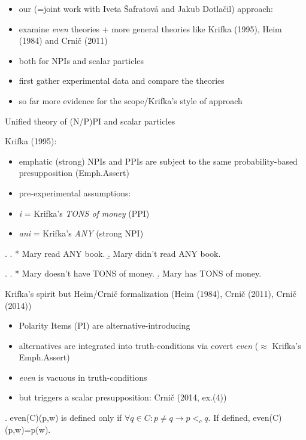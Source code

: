 \documentclass[ignorenonframetext,]{beamer}
\providecommand{\tightlist}{%
  \setlength{\itemsep}{0pt}\setlength{\parskip}{0pt}}
\begin{document}
\begin{frame}

\begin{itemize}
\tightlist
\item
  our (=joint work with Iveta Šafratová and Jakub Dotlačil) approach:
\item
  examine \emph{even} theories + more general theories like Krifka
  (1995), Heim (1984) and Crnič (2011)
\item
  both for NPIs and scalar particles
\item
  first gather experimental data and compare the theories
\item
  so far more evidence for the scope/Krifka's style of approach
\end{itemize}

\end{frame}

\begin{frame}{Unified theory of (N/P)PI and scalar particles}

Krifka (1995):

\begin{itemize}
\tightlist
\item
  emphatic (strong) NPIs and PPIs are subject to the same
  probability-based presupposition (Emph.Assert)
\item
  pre-experimental assumptions:
\item
  \emph{i} = Krifka's \emph{TONS of money} (PPI)
\item
  \emph{ani} = Krifka's \emph{ANY} (strong NPI)
\end{itemize}

\ex. \a. * Mary read ANY book. \b. Mary didn't read ANY book.

\ex. \a. * Mary doesn't have TONS of money. \b. Mary has TONS of money.

\end{frame}

\begin{frame}

Krifka's spirit but Heim/Crnič formalization (Heim (1984), Crnič (2011),
Crnič (2014))

\begin{itemize}
\tightlist
\item
  Polarity Items (PI) are alternative-introducing
\item
  alternatives are integrated into truth-conditions via covert
  \emph{even} (\(\approx\) Krifka's Emph.Assert)
\item
  \emph{even} is vacuous in truth-conditions
\item
  but triggers a scalar presupposition: Crnič (2014, ex.(4))
\end{itemize}

\ex. even(C)(p,w) is defined only if
\(\forall q \in C: p \neq q \rightarrow p <_c q\). If defined,
even(C)(p,w)=p(w).

\end{frame}
\end{document}
